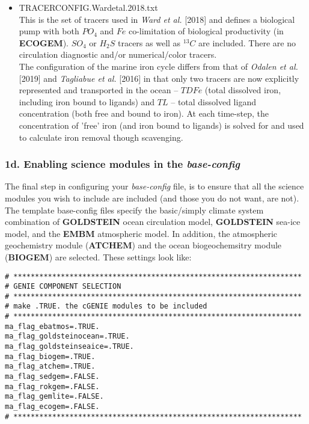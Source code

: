 \documentclass[11pt,fleqn]{book} %
\begin{document}
\begin{itemize}[noitemsep]
\vspace{2mm}
\item \textsf{\footnotesize TRACERCONFIG.Wardetal.2018.txt}
\vspace{1mm}
\\This is the set of tracers used in \textit{Ward et al.} [2018] and defines a biological pump with both \(PO_{4}\) and \(Fe\) co-limitation of biological productivity (in \textbf{ECOGEM}). \(SO_{4}\) or \(H_{2}S\) tracers as well as \(^{13}C\) are included. There are no circulation diagnostic and/or numerical/color tracers.
\\The configuration of the marine iron cycle differs from that of \textit{Odalen et al.} [2019] and \textit{Tagliabue et al.} [2016] in that only two tracers are now explicitly represented and transported in the ocean -- \(TDFe\) (total dissolved iron, including iron bound to ligands) and \(TL\) -- total dissolved ligand concentration (both free and bound to iron). At each time-step, the concentration of 'free' iron (and iron bound to ligands) is solved for and used to calculate iron removal though scavenging.

\end{itemize}

%
\subsubsection{1d. Enabling science modules in the \textit{base-config}}

The final step in configuring your \textit{base-config} file, is to ensure that all the science modules you wish to include are included (and those you do not want, are not). The template base-config files specify the basic/simply climate system combination of \textbf{GOLDSTEIN} ocean circulation model, \textbf{GOLDSTEIN} sea-ice model, and the \textbf{EMBM} atmospheric model. In addition, the atmospheric geochemistry module (\textbf{ATCHEM}) and the ocean biogeochemsitry module (\textbf{BIOGEM}) are selected. These settings look like:

\footnotesize\vspace{-2pt}\begin{verbatim}
# *******************************************************************
# GENIE COMPONENT SELECTION
# *******************************************************************
# make .TRUE. the cGENIE modules to be included
# *******************************************************************
ma_flag_ebatmos=.TRUE.
ma_flag_goldsteinocean=.TRUE.
ma_flag_goldsteinseaice=.TRUE.
ma_flag_biogem=.TRUE.
ma_flag_atchem=.TRUE.
ma_flag_sedgem=.FALSE.
ma_flag_rokgem=.FALSE.
ma_flag_gemlite=.FALSE.
ma_flag_ecogem=.FALSE.
# *******************************************************************
\end{verbatim}\vspace{-2pt}\normalsize
\end{document}

